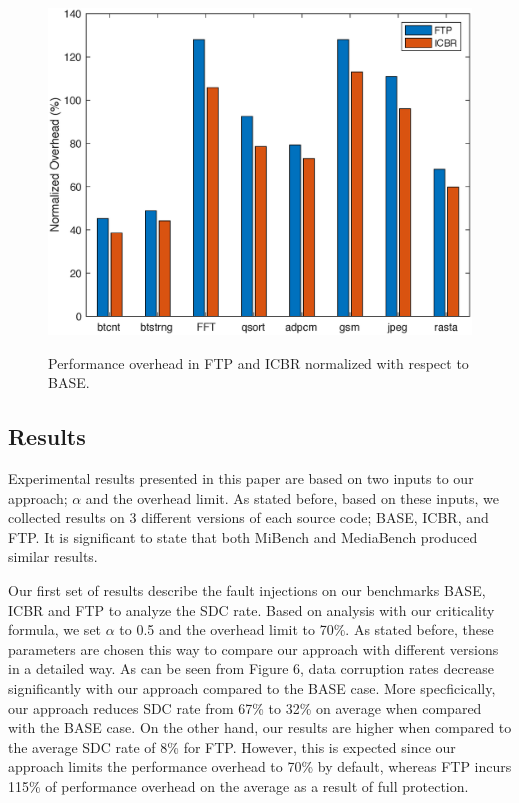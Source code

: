 \begin{figure}[!t]
\begin{center}
{\label{fig:plan_13}\includegraphics[scale=0.42]{./figures/baseline_overhead.eps}}
\end{center}
\caption{Performance overhead in FTP and ICBR normalized with respect to BASE.}
\label{fig:plan_13}
\end{figure}



\subsection{Results}\label{sec:Results}
Experimental results presented in this paper are based on two inputs to our approach; $\alpha$ and the overhead limit. As stated before, based on these inputs, we collected results on 3 different versions of each source code; BASE, ICBR, and FTP. It is significant to state that both MiBench and MediaBench produced similar results. 

Our first set of results describe the fault injections on our benchmarks BASE, ICBR and FTP  to analyze the SDC rate. Based on analysis with our criticality formula, we set $\alpha$ to 0.5 and the overhead limit to 70\%. As stated before, these parameters are chosen this way to compare our approach with different versions in a detailed way. As can be seen from Figure 6, data corruption rates decrease significantly with our approach compared to the BASE case. More specficically, our approach reduces SDC rate from 67\% to 32\% on average when compared with the BASE case. On the other hand, our results are higher when compared to the average SDC rate of 8\% for FTP. However, this is expected since our approach limits the performance overhead to 70\% by default, whereas FTP incurs 115\% of performance overhead on the average as a result of full protection. 

